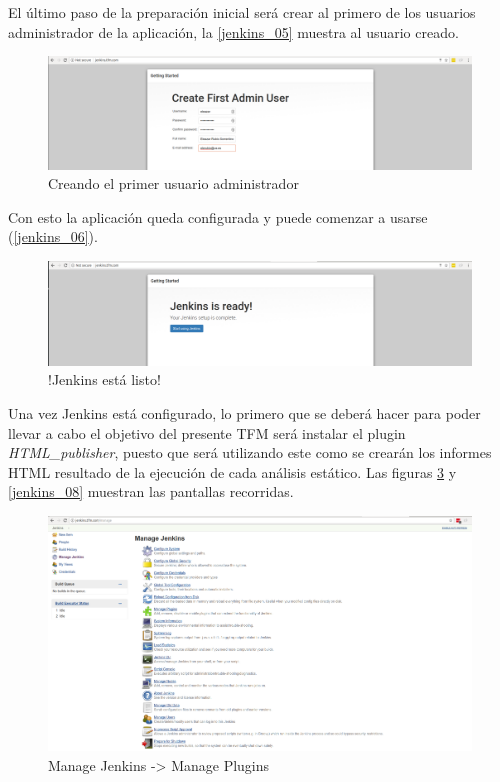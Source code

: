 El último paso de la preparación inicial será crear al primero de los usuarios administrador de la aplicación, la \autoref{jenkins_05} muestra al usuario creado.

\begin{figure}[htbp]
	\centering
	\includegraphics[width=1.0\linewidth]
	{desarrollo/figuras/jenkins_05.png}
	\caption{Creando el primer usuario administrador}
	\label{jenkins_05}
\end{figure}

Con esto la aplicación queda configurada y puede comenzar a usarse (\autoref{jenkins_06}).

\begin{figure}[htbp]
	\centering
	\includegraphics[width=1.0\linewidth]
	{desarrollo/figuras/jenkins_06.png}
	\caption{!Jenkins está listo!}
	\label{jenkins_06}
\end{figure}

Una vez Jenkins está configurado, lo primero que se deberá hacer para poder llevar a cabo el objetivo del presente \gls{TFM} será instalar el plugin \textit{HTML\_publisher}, puesto que será utilizando este como se crearán los informes HTML resultado de la ejecución de cada análisis estático. Las figuras \ref{jenkins_07} y \ref{jenkins_08} muestran las pantallas recorridas.

\begin{figure}[htbp]
	\centering
	\includegraphics[width=1.0\linewidth]
	{desarrollo/figuras/jenkins_07.png}
	\caption{Manage Jenkins -> Manage Plugins}
	\label{jenkins_07}
\end{figure}

